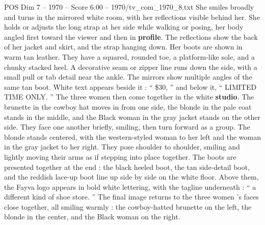 \begin{textsample}{POS Dim 7 – 1970 – Score 6.00 – 1970/tv\_com\_1970\_8.txt}
She smiles broadly and turns in the mirrored white room, with her reflections visible behind her.
She holds or adjusts the long strap at her side while walking or posing, her body angled first toward the viewer and then in \textbf{profile}.
The reflections show the back of her jacket and skirt, and the strap hanging down.
Her boots are shown in warm tan leather.
They have a squared, rounded toe, a platform-like sole, and a chunky stacked heel.
A decorative seam or zipper line runs down the side, with a small pull or tab detail near the ankle.
The mirrors show multiple angles of the same tan boot.
White text appears beside it : “ \$30, ” and below it, “ LIMITED TIME ONLY. ” The three women then come together in the white \textbf{studio}.
The brunette in the cowboy hat moves in from one side, the blonde in the pale coat stands in the middle, and the Black woman in the gray jacket stands on the other side.
They face one another briefly, smiling, then turn forward as a group.
The blonde stands centered, with the western-styled woman to her left and the woman in the gray jacket to her right.
They pose shoulder to shoulder, smiling and lightly moving their arms as if stepping into place together.
The boots are presented together at the end : the black heeled boot, the tan side-detail boot, and the reddish lace-up boot line up side by side on the white floor.
Above them, the Fayva logo appears in bold white lettering, with the tagline underneath : “ a different kind of shoe store. ” The final image returns to the three women ’s faces close together, all smiling warmly : the cowboy-hatted brunette on the left, the blonde in the center, and the Black woman on the right.

\end{textsample}
